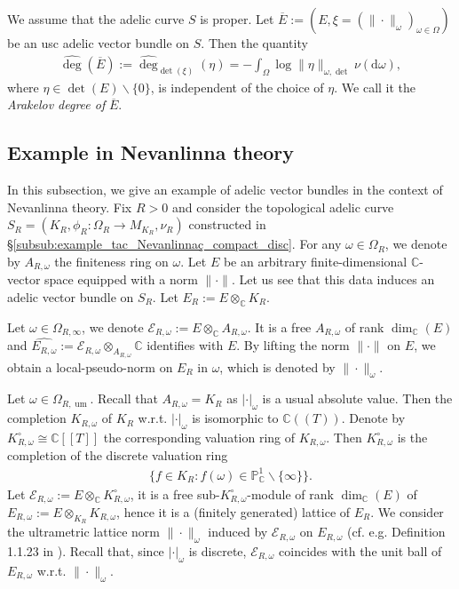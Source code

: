 \documentclass [11pt,reqno]{amsart}
\def\bC{{\mathbb{C}}}
\newcommand{\1}{\mathmybb{1}}
\def\cE{{\mathcal{E}}}
\def\diff{\mathrm{d}}
\def\um{\operatorname{um}}
\def\setminus{\smallsetminus}
\begin{document}
\begin{definition}
\label{def:Arakelov_degree_proper_adelic_curve}
We assume that the adelic curve $S$ is proper. Let $\overline{E}:= (E,\xi=(\|\cdot\|_{\omega})_{\omega\in\Omega})$ be an usc adelic vector bundle on $S$. Then the quantity
\begin{align*}
\widehat{\deg}(\overline{E}):= \widehat{\deg}_{\det(\xi)}(\eta) = - \int_{\Omega} \log\|\eta\|_{\omega,\det}\nu(\diff\omega),
\end{align*}
where $\eta\in\det(E)\setminus\{0\}$, is independent of the choice of $\eta$. We call it the \emph{Arakelov degree of} $\overline{E}$.
\end{definition}

\subsection{Example in Nevanlinna theory}
\label{sub:example_in_Nevanlinna_theory_avb}

In this subsection, we give an example of adelic vector bundles in the context of Nevanlinna theory. Fix $R>0$ and consider the topological adelic curve $S_R =(K_R,\phi_R:\Omega_R \to M_{K_R},\nu_R)$ constructed in \S \ref{subsub:example_tac_Nevanlinnaç_compact_disc}. For any $\omega\in\Omega_{R}$, we denote by $A_{R,\omega}$ the finiteness ring on $\omega$. Let $E$ be an arbitrary finite-dimensional $\bC$-vector space equipped with a norm $\|\cdot\|$. Let us see that this data induces an adelic vector bundle on $S_R$. Let $E_R := E \otimes_{\bC} K_R$. 

Let $\omega\in \Omega_{R,\infty}$, we denote $\cE_{R,\omega} := E \otimes_{\bC} A_{R,\omega}$. It is a free $A_{R,\omega}$ of rank $\dim_{\bC}(E)$ and $\widehat{E_{R,\omega}} := \cE_{R,\omega} \otimes_{A_{R,\omega}} \bC$ identifies with $E$. By lifting the norm $\|\cdot\|$ on $E$, we obtain a local-pseudo-norm on $E_R$ in $\omega$, which is denoted by $\|\cdot\|_{\omega}$. 

Let $\omega\in \Omega_{R,\um}$. Recall that $A_{R,\omega} = K_R$ as $|\cdot|_{\omega}$ is a usual absolute value. Then the completion $K_{R,\omega}$ of $K_{R}$ w.r.t. $|\cdot|_{\omega}$ is isomorphic to $\bC((T))$. Denote by $K_{R,\omega}^{\circ}\cong\bC[[T]]$ the corresponding valuation ring of $K_{R,\omega}$. Then $K_{R,\omega}^{\circ}$ is the completion of the discrete valuation ring
\begin{align*}
\{f\in K_R : f(\omega) \in \mathbb{P}^{1}_{\bC} \setminus\{\infty\}\}.
\end{align*}
Let $\cE_{R,\omega} := E \otimes_{\bC} K_{R,\omega}^{\circ}$, it is a free sub-$K_{R,\omega}^{\circ}$-module of rank $\dim_{\bC}(E)$ of $E_{R,\omega}:= E \otimes_{K_{R}} K_{R,\omega}$, hence it is a (finitely generated) lattice of $E_R$. We consider the ultrametric lattice norm $\|\cdot\|_{\omega}$ induced by $\cE_{R,\omega}$ on $E_{R,\omega}$ (cf. e.g. Definition 1.1.23 in \cite{ChenMori}). Recall that, since $|\cdot|_{\omega}$ is discrete, $\cE_{R,\omega}$ coincides with the unit ball of $E_{R,\omega}$ w.r.t. $\|\cdot\|_{\omega}$. 
\end{document}
